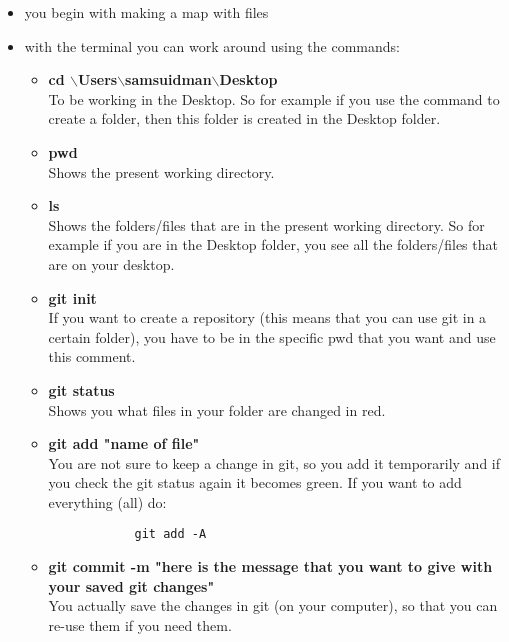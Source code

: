 \documentclass{article}
\begin{document}
\begin{itemize}
    \item you begin with making a map with files
    \item with the terminal you can work around using the commands: \\
    \begin{itemize}    
        \item \textbf{cd  $\backslash$Users$\backslash$samsuidman$\backslash$Desktop} \\
        To be working in the Desktop. So for example if you use the command to create a folder, then this folder is created in the Desktop folder. \\
        
        \item \textbf{pwd} \\
        Shows the present working directory. \\
        
        \item \textbf{ls} \\
        Shows the folders/files that are in the present working directory. So for example if you are in the Desktop folder, you see all the folders/files that are on your desktop. \\
        
        \item \textbf{git init} \\
        If you want to create a repository (this means that you can use git in a certain folder), you have to be in the specific pwd that you want and use this comment. \\
        
        \item \textbf{git status} \\
        Shows you what files in your folder are changed in red. \\
        
        \item \textbf{git add "name of file"} \\
        You are not sure to keep a change in git, so you add it temporarily and if you check the git status again it becomes green. If you want to add everything (all) do:
        \begin{verbatim}
            git add -A
        \end{verbatim}
        
        \item \textbf{git commit -m "here is the message that you want to give with your saved git changes"} \\
        You actually save the changes in git (on your computer), so that you can re-use them if you need them.
        

\end{itemize}
\end{itemize}
\end{document}
